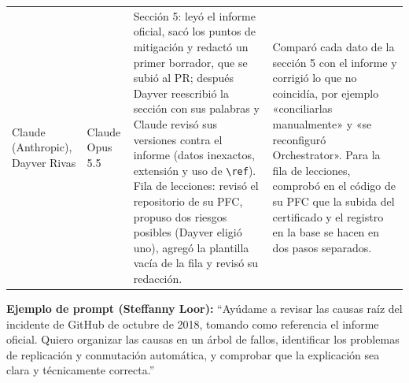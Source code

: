 {\begin{xltabular}{\textwidth}{@{}>{\raggedright\arraybackslash}p{2.5cm}>{\raggedright\arraybackslash}p{1.7cm}LL@{}}
    \addlinespace
    Claude (Anthropic), Dayver Rivas & Claude Opus 5.5 & Sección 5: leyó el informe oficial, sacó los puntos de mitigación y redactó un primer borrador, que se subió al PR; después Dayver reescribió la sección con sus palabras y Claude revisó sus versiones contra el informe (datos inexactos, extensión y uso de \texttt{\textbackslash ref}). Fila de lecciones: revisó el repositorio de su PFC, propuso dos riesgos posibles (Dayver eligió uno), agregó la plantilla vacía de la fila y revisó su redacción. & Comparó cada dato de la sección 5 con el informe y corrigió lo que no coincidía, por ejemplo «conciliarlas manualmente» y «se reconfiguró Orchestrator». Para la fila de lecciones, comprobó en el código de su PFC que la subida del certificado y el registro en la base se hacen en dos pasos separados. \\
\end{xltabular}
}

\noindent\textbf{Ejemplo de prompt (Steffanny Loor):} ``Ayúdame a revisar las causas raíz del incidente de GitHub de octubre de 2018, tomando como referencia el informe oficial. Quiero organizar las causas en un árbol de fallos, identificar los problemas de replicación y conmutación automática, y comprobar que la explicación sea clara y técnicamente correcta.''
